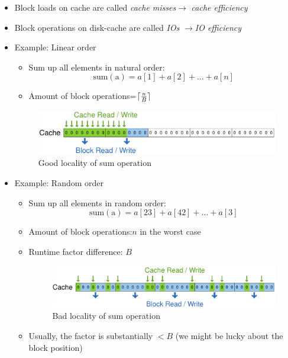 \documentclass[12pt, a4paper]{scrartcl}
\newcommand{\imgwidth}{.7\textwidth}
\DeclarePairedDelimiter{\ceil}{\lceil}{\rceil}
\begin{document}
\begin{itemize}
\begin{itemize}
  \end{itemize}
\item Block loads on cache are called \emph{cache misses}$\rightarrow$ \emph{cache efficiency}
\item Block operations on disk-cache are called \emph{IOs} $\rightarrow$\emph{IO efficiency}
\item Example: Linear order
  \begin{itemize}
  \item Sum up all elements in natural order:
    \[\mathrm{sum(a)}=a[1]+a[2]+...+a[n]\]
  \item Amount of block operations=$\ceil{\frac{n}{B}}$
  \end{itemize}
  
  \begin{figure}[htbp]
    \centering
    \includegraphics[width=\imgwidth]{good_locality}
    \caption{Good locality of sum operation}
    \label{fig:good_locality}
  \end{figure}
  
\item Example: Random order
  \begin{itemize}
  \item Sum up all elements in random order:
    \[\mathrm{sum(a)}=a[23]+a[42]+...+a[3]\]
  \item Amount of block operations:$n$ in the worst case
  \item Runtime factor difference: $B$
    \begin{figure}[htbp]
      \centering
      \includegraphics[width=\imgwidth]{bad_locality}
      \caption{Bad locality of sum operation}
      \label{fig:good_locality}
    \end{figure}
  \item Usually, the factor is substantially $< B$ (we might be lucky about the block position)
  \end{itemize}
\end{itemize}
\end{document}
